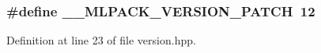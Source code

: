 \subsubsection[{\-\_\-\-\_\-\-M\-L\-P\-A\-C\-K\-\_\-\-V\-E\-R\-S\-I\-O\-N\-\_\-\-P\-A\-T\-C\-H}]{\setlength{\rightskip}{0pt plus 5cm}\#define \-\_\-\-\_\-\-M\-L\-P\-A\-C\-K\-\_\-\-V\-E\-R\-S\-I\-O\-N\-\_\-\-P\-A\-T\-C\-H~12}\label{src_2mlpack_2core_2util_2version_8hpp_a2dcfe77a31e42a9552e09f0971eb55b9}


Definition at line 23 of file version.\-hpp.

